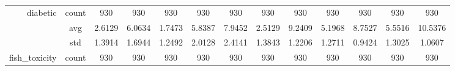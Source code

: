 \begin{table}[htbp]
{\begin{tabular}{rcccccccccccc}
			diabetic                           & count                                  & 930                                                                                & 930                                                                       & 930                                                                       & 930                                                                       & 930                                           & 930                                         & 930                                            & 930                                            & 930                                            & 930                                            & 930                                            \\
			                                   & avg                                    & 2.6129                                                                             & 6.0634                                                                    & \cellcolor[rgb]{ .776,  .937,  .808}\textcolor[rgb]{ 0,  .38,  0}{1.7473} & 5.8387                                                                    & 7.9452                                        & 2.5129                                      & 9.2409                                         & 5.1968                                         & 8.7527                                         & 5.5516                                         & 10.5376                                        \\
			                                   & std                                    & 1.3914                                                                             & 1.6944                                                                    & 1.2492                                                                    & 2.0128                                                                    & 2.4141                                        & 1.3843                                      & 1.2206                                         & 1.2711                                         & 0.9424                                         & 1.3025                                         & 1.0607                                         \\
			fish\_toxicity                     & count                                  & 930                                                                                & 930                                                                       & 930                                                                       & 930                                                                       & 930                                           & 930                                         & 930                                            & 930                                            & 930                                            & 930                                            & 930                                            \\

\end{tabular}}
\end{table}
